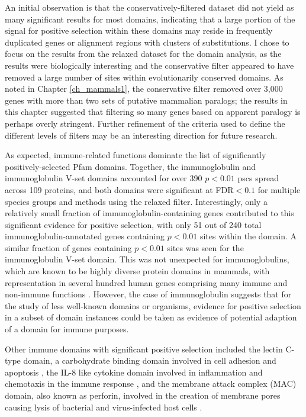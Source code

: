 An initial observation is that the conservatively-filtered dataset did
not yield as many significant results for most domains, indicating
that a large portion of the signal for positive selection within these
domains may reside in frequently duplicated genes or alignment regions
with clusters of \nsyn substitutions. I chose to focus on the results
from the relaxed dataset for the domain analysis, as the results were
biologically interesting and the conservative filter appeared to have
removed a large number of sites within evolutionarily conserved
domains. As noted in Chapter \ref{ch_mammals1}, the conservative
filter removed over 3,000 genes with more than two sets of putative
mammalian paralogs; the results in this chapter suggested that
filtering so many genes based on apparent paralogy is perhaps overly
stringent. Further refinement of the criteria used to define the
different levels of \sw filters may be an interesting direction for
future research.

As expected, immune-related functions dominate the list of
significantly positively-selected Pfam domains. Together, the
immunoglobulin and immunoglobulin V-set domains accounted for over 390
$p<0.01$ \acp{psc} spread across 109 proteins, and both domains were
significant at FDR$<0.1$ for multiple species groups and methods using
the relaxed \sw filter. Interestingly, only a relatively small
fraction of immunoglobulin-containing genes contributed to this
significant evidence for positive selection, with only 51 out of 240
total immunoglobulin-annotated genes containing $p<0.01$ sites within
the domain. A similar fraction of genes containing $p<0.01$ sites was
seen for the immunoglobulin V-set domain. This was not unexpected for
immunoglobulins, which are known to be highly diverse protein domains
in mammals, with representation in several hundred human genes
comprising many immune and non-immune functions
\citep{Lander2001}. However, the case of immunoglobulin suggests that
for the study of less well-known domains or organisms, evidence for
positive selection in a subset of domain instances could be taken as
evidence of potential adaption of a domain for immune purposes.

Other immune domains with significant positive selection included the
lectin C-type domain, a carbohydrate binding domain involved in cell
adhesion and apoptosis \citep{Cambi2009}, the IL-8 like cytokine
domain involved in inflammation and chemotaxis in the immune response
\citep{Stein2005}, and the membrane attack complex (MAC) domain, also
known as perforin, involved in the creation of membrane pores causing
lysis of bacterial and virus-infected host cells \citep{Lovelace2011}.

